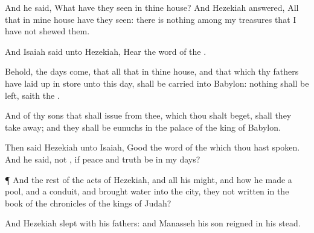{And he
said, What have they
seen in thine
house? And
Hezekiah
answered, All
{} that
{} in mine
house have they
seen: there is
nothing among my
treasures that I have not
shewed them.

And
Isaiah
said unto
Hezekiah,
Hear the
word of the
{}.

Behold, the
days
come, that all that
{} in thine
house, and that which thy
fathers have laid up in
store unto this
day, shall be
carried into
Babylon:
nothing shall be
left,
saith the
{}.

And of thy
sons that shall
issue from thee, which thou shalt
beget, shall they take
away; and they shall be
eunuchs in the
palace of the
king of
Babylon.

Then
said
Hezekiah unto
Isaiah,
Good
{} the
word of the
{} which thou hast
spoken. And he
said,
{} not
{}, if
peace and
truth be in my
days?


\par }{\PP {}¶ And the
rest of the
acts of
Hezekiah, and all his
might, and how he
made a
pool, and a
conduit, and
brought
water into the
city,
{} they not
written in the
book of the
chronicles of the
kings of
Judah?

And
Hezekiah
slept with his
fathers: and
Manasseh his
son
reigned in his stead.




\par }

